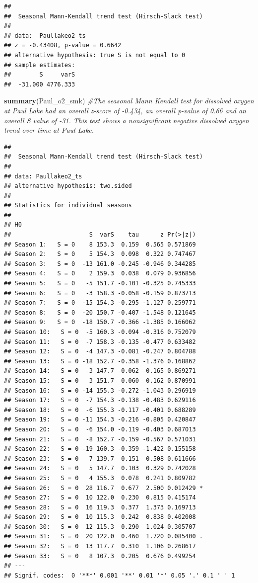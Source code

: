 \documentclass[12pt,]{article}
\newenvironment{Shaded}{\begin{snugshade}}{\end{snugshade}}
\newcommand{\KeywordTok}[1]{\textcolor[rgb]{0.13,0.29,0.53}{\textbf{#1}}}
\newcommand{\CommentTok}[1]{\textcolor[rgb]{0.56,0.35,0.01}{\textit{#1}}}
\newcommand{\NormalTok}[1]{#1}
\begin{document}
\begin{verbatim}
## 
##  Seasonal Mann-Kendall trend test (Hirsch-Slack test)
## 
## data:  Paullakeo2_ts
## z = -0.43408, p-value = 0.6642
## alternative hypothesis: true S is not equal to 0
## sample estimates:
##        S     varS 
##  -31.000 4776.333
\end{verbatim}

\begin{Shaded}
\begin{Highlighting}[]
\KeywordTok{summary}\NormalTok{(Paul_o2_smk) }\CommentTok{#The seasonal Mann Kendall test for dissolved oxygen at Paul Lake had an overall z-score of -0.434, an overall p-value of 0.66 and an overall S value of -31. This test shows a nonsignificant negative dissolved oxygen trend over time at Paul Lake.}
\end{Highlighting}
\end{Shaded}

\begin{verbatim}
## 
##  Seasonal Mann-Kendall trend test (Hirsch-Slack test)
## 
## data: Paullakeo2_ts
## alternative hypothesis: two.sided
## 
## Statistics for individual seasons
## 
## H0
##                      S  varS    tau      z Pr(>|z|)  
## Season 1:   S = 0    8 153.3  0.159  0.565 0.571869  
## Season 2:   S = 0    5 154.3  0.098  0.322 0.747467  
## Season 3:   S = 0  -13 161.0 -0.245 -0.946 0.344285  
## Season 4:   S = 0    2 159.3  0.038  0.079 0.936856  
## Season 5:   S = 0   -5 151.7 -0.101 -0.325 0.745333  
## Season 6:   S = 0   -3 158.3 -0.058 -0.159 0.873713  
## Season 7:   S = 0  -15 154.3 -0.295 -1.127 0.259771  
## Season 8:   S = 0  -20 150.7 -0.407 -1.548 0.121645  
## Season 9:   S = 0  -18 150.7 -0.366 -1.385 0.166062  
## Season 10:   S = 0  -5 160.3 -0.094 -0.316 0.752079  
## Season 11:   S = 0  -7 158.3 -0.135 -0.477 0.633482  
## Season 12:   S = 0  -4 147.3 -0.081 -0.247 0.804788  
## Season 13:   S = 0 -18 152.7 -0.358 -1.376 0.168862  
## Season 14:   S = 0  -3 147.7 -0.062 -0.165 0.869271  
## Season 15:   S = 0   3 151.7  0.060  0.162 0.870991  
## Season 16:   S = 0 -14 155.3 -0.272 -1.043 0.296919  
## Season 17:   S = 0  -7 154.3 -0.138 -0.483 0.629116  
## Season 18:   S = 0  -6 155.3 -0.117 -0.401 0.688289  
## Season 19:   S = 0 -11 154.3 -0.216 -0.805 0.420847  
## Season 20:   S = 0  -6 154.0 -0.119 -0.403 0.687013  
## Season 21:   S = 0  -8 152.7 -0.159 -0.567 0.571031  
## Season 22:   S = 0 -19 160.3 -0.359 -1.422 0.155158  
## Season 23:   S = 0   7 139.7  0.151  0.508 0.611666  
## Season 24:   S = 0   5 147.7  0.103  0.329 0.742028  
## Season 25:   S = 0   4 155.3  0.078  0.241 0.809782  
## Season 26:   S = 0  28 116.7  0.677  2.500 0.012429 *
## Season 27:   S = 0  10 122.0  0.230  0.815 0.415174  
## Season 28:   S = 0  16 119.3  0.377  1.373 0.169713  
## Season 29:   S = 0  10 115.3  0.242  0.838 0.402008  
## Season 30:   S = 0  12 115.3  0.290  1.024 0.305707  
## Season 31:   S = 0  20 122.0  0.460  1.720 0.085400 .
## Season 32:   S = 0  13 117.7  0.310  1.106 0.268617  
## Season 33:   S = 0   8 107.3  0.205  0.676 0.499254  
## ---
## Signif. codes:  0 '***' 0.001 '**' 0.01 '*' 0.05 '.' 0.1 ' ' 1
\end{verbatim}
\end{document}
